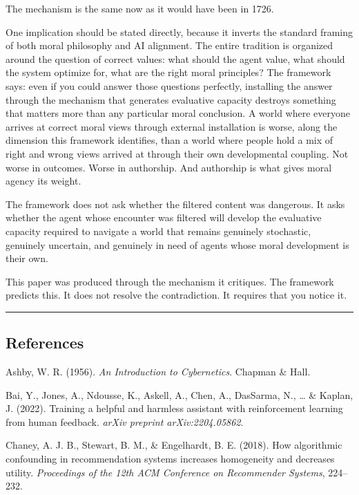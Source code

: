 \documentclass[
]{article}
\begin{document}
The mechanism is the same now as it would have been in 1726.

One implication should be stated directly, because it inverts the
standard framing of both moral philosophy and AI alignment. The entire
tradition is organized around the question of correct values: what
should the agent value, what should the system optimize for, what are
the right moral principles? The framework says: even if you could answer
those questions perfectly, installing the answer through the mechanism
that generates evaluative capacity destroys something that matters more
than any particular moral conclusion. A world where everyone arrives at
correct moral views through external installation is worse, along the
dimension this framework identifies, than a world where people hold a
mix of right and wrong views arrived at through their own developmental
coupling. Not worse in outcomes. Worse in authorship. And authorship is
what gives moral agency its weight.

The framework does not ask whether the filtered content was dangerous.
It asks whether the agent whose encounter was filtered will develop the
evaluative capacity required to navigate a world that remains genuinely
stochastic, genuinely uncertain, and genuinely in need of agents whose
moral development is their own.

This paper was produced through the mechanism it critiques. The
framework predicts this. It does not resolve the contradiction. It
requires that you notice it.

\begin{center}\rule{0.5\linewidth}{0.5pt}\end{center}

\subsection{References}\label{references}

Ashby, W. R. (1956). \emph{An Introduction to Cybernetics}. Chapman \&
Hall.

Bai, Y., Jones, A., Ndousse, K., Askell, A., Chen, A., DasSarma, N.,
\ldots{} \& Kaplan, J. (2022). Training a helpful and harmless assistant
with reinforcement learning from human feedback. \emph{arXiv preprint
arXiv:2204.05862}.

Chaney, A. J. B., Stewart, B. M., \& Engelhardt, B. E. (2018). How
algorithmic confounding in recommendation systems increases homogeneity
and decreases utility. \emph{Proceedings of the 12th ACM Conference on
Recommender Systems}, 224--232.
\end{document}

